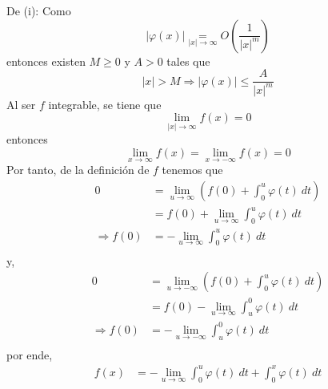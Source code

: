\documentclass[12pt]{report}
\newcounter{it}
\theoremstyle{largebreak}
\renewcommand{\leq}{\ensuremath{\leqslant}}
\renewcommand{\geq}{\ensuremath{\geqslant}}
\newcommand\abs[1]{\ensuremath{\left|#1\right|}}
\begin{document}
    \begin{sol}
        De (i): Como
        \begin{equation*}
            \abs{\varphi(x)}\underset{\abs{x}\rightarrow\infty}{=}O\left(\frac{1}{\abs{x}^m}\right)
        \end{equation*}
        entonces existen $M\geq0$ y $A>0$ tales que
        \begin{equation*}
            \abs{x}>M\Rightarrow \abs{\varphi(x)}\leq \frac{A}{\abs{x}^m}
        \end{equation*}
        Al ser $f$ integrable, se tiene que
        \begin{equation*}
            \lim_{\abs{x}\rightarrow\infty}f(x)=0
        \end{equation*}
        entonces
        \begin{equation*}
            \lim_{x\rightarrow\infty}f(x)=\lim_{x\rightarrow-\infty}f(x)=0
        \end{equation*}
        Por tanto, de la definición de $f$ tenemos que
        \begin{equation*}
            \begin{split}
                0&=\lim_{u\rightarrow\infty}\left(f(0)+\int_0^u\varphi(t)\:dt\right)\\
                &=f(0)+\lim_{u\rightarrow\infty}\int_0^u\varphi(t)\:dt\\
                \Rightarrow f(0)&=-\lim_{u\rightarrow\infty}\int_0^u\varphi(t)\:dt\\
            \end{split}
        \end{equation*}
        y,
        \begin{equation*}
            \begin{split}
                0&=\lim_{u\rightarrow-\infty}\left(f(0)+\int_0^u\varphi(t)\:dt\right)\\
                &=f(0)-\lim_{u\rightarrow\infty}\int_u^0\varphi(t)\:dt\\
                \Rightarrow f(0)&=-\lim_{u\rightarrow-\infty}\int_u^0\varphi(t)\:dt\\
            \end{split}
        \end{equation*}
        por ende,
        \begin{equation*}
            \begin{split}
                f(x)&=-\lim_{u\rightarrow\infty}\int_0^u\varphi(t)\:dt+\int_0^x\varphi(t)\:dt\\

\end{split}
\end{equation*}
\end{sol}
\end{document}
